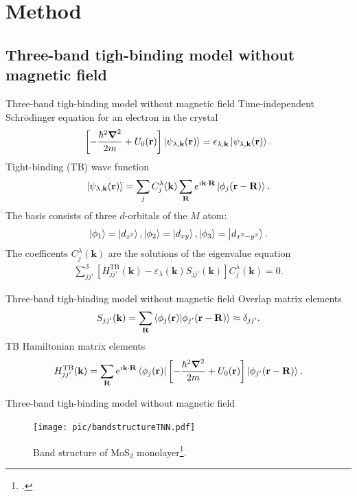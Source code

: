 \documentclass[aspectratio=169,compress,x11names]{beamer}
\begin{document}
	\section{Method}
	\subsection{Three-band tigh-binding model without magnetic field}
	\begin{frame}{Three-band tigh-binding model without magnetic field}
		Time-independent Schr\"{o}dinger equation for an electron in the crystal
		\begin{gather}
			\left[-\frac{\hbar^{2} \boldsymbol{\nabla}^{2}}{2m} + U_{0}(\mathbf{r})\right] \ket{\psi_{\lambda,\mathbf{k}}(\mathbf{r})} = \epsilon_{\lambda,\mathbf{k}} \ket{\psi_{\lambda,\mathbf{k}}(\mathbf{r})}.
		\end{gather}
		Tight-binding (TB) wave function
		\begin{gather}
			\ket{\psi_{\lambda,\mathbf{k}}(\mathbf{r})} = \sum_{j} C_{j}^{\lambda}(\mathbf{k}) \sum_{\mathbf{R}} e^{i \mathbf{k} \cdot \mathbf{R}} \ket{\phi_{j} (\mathbf{r} - \mathbf{R})}.
		\end{gather}
		The basis consists of three $d$-orbitals of the $M$ atom:
		\begin{gather}
			\ket{\phi_{1}} = \ket{d_{z^{2}}} , 
			\ket{\phi_{2}} = \ket{d_{xy}} , 
			\ket{\phi_{3}} = \ket{d_{x^{2} - y^{2}}}.
		\end{gather}
		The coefficents $C_{j}^{\lambda}(\mathbf{k})$ are the solutions of the eigenvalue equation
		\begin{gather}
			\sum_{jj'}^{3} \left[H_{jj'}^{\text{TB}}(\mathbf{k}) - \varepsilon_{\lambda}(\mathbf{k}) S_{jj'}(\mathbf{k})\right] C_{j}^{\lambda}(\mathbf{k}) = 0.
		\end{gather}
	\end{frame}
	\begin{frame}{Three-band tigh-binding model without magnetic field}
		Overlap matrix elements
		\begin{gather}
			S_{jj'}(\mathbf{k}) = \sum_{\mathbf{R}} \bra{\phi_{j}(\mathbf{r})} \ket{\phi_{j'}(\mathbf{r - R})} \approx \delta_{jj'}.
		\end{gather}
		TB Hamiltonian matrix elements
		\begin{gather}
			H_{jj'}^{\text{TB}}(\mathbf{k}) = \sum_{\mathbf{R}} e^{i \mathbf{k \cdot R}} \bra{\phi_{j}(\mathbf{r})} \left[-\frac{\hbar^{2} \boldsymbol{\nabla}^{2}}{2m} + U_{0}(\mathbf{r})\right] \ket{\phi_{j'}(\mathbf{r - R})}.
		\end{gather}
	\end{frame}
	\begin{frame}{Three-band tigh-binding model without magnetic field}
		\begin{figure}
			\centering
			\texttt{[image: pic/bandstructureTNN.pdf]}
			\caption{Band structure of MoS$_{2}$ monolayer\footcite{PhysRevB.88.085433}.}
		\end{figure}
	\end{frame}
\end{document}
